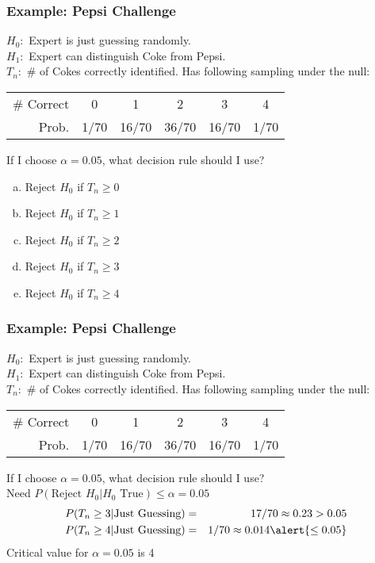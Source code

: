 \documentclass{beamer}
\begin{document}
\begin{frame}
\frametitle{Example: Pepsi Challenge }
\footnotesize 
$H_0\colon$ Expert is just guessing randomly.\\
$H_1\colon$ Expert can distinguish Coke from Pepsi.\\
$T_n\colon$ \# of Cokes correctly identified. Has following sampling under the null:
		\begin{center}
		\begin{tabular}{rccccc}
		\hline \footnotesize
		\# Correct & 0 & 1 & 2 & 3 & 4\\
		Prob.&1/70 & 16/70 & 36/70 & 16/70 &1/70\\
		\hline
		\end{tabular}
	\end{center}
	\vspace{2em}
	\normalsize
	\alert{If I choose $\alpha =0.05$, what decision rule should I use?}
	\begin{enumerate}[(a)]
		\item Reject $H_0$ if $T_n \geq 0$
		\item Reject $H_0$ if $T_n \geq 1$
		\item Reject $H_0$ if $T_n \geq 2$
		\item Reject $H_0$ if $T_n \geq 3$
		\item Reject $H_0$ if $T_n \geq 4$
	\end{enumerate}
\end{frame}
\begin{frame}
\frametitle{Example: Pepsi Challenge}
\footnotesize 
$H_0\colon$ Expert is just guessing randomly.\\
$H_1\colon$ Expert can distinguish Coke from Pepsi.\\
$T_n\colon$ \# of Cokes correctly identified. Has following sampling under the null:
		\begin{center}
		\begin{tabular}{rccccc}
		\hline \footnotesize
		\# Correct & 0 & 1 & 2 & 3 & 4\\
		Prob.&1/70 & 16/70 & 36/70 & 16/70 &1/70\\
		\hline
		\end{tabular}
	\end{center}
	\vspace{2em}
	\normalsize
	\alert{If I choose $\alpha =0.05$, what decision rule should I use?}\\
\vspace{1em}
	Need $P(\mbox{Reject } H_0|H_0 \mbox{ True})\leq \alpha = 0.05$ 
	\begin{eqnarray*}
		P(T_n \geq 3 |\mbox{Just Guessing}) &=& 17/70 \approx 0.23 > 0.05 \\
	P(T_n \geq 4 |\mbox{Just Guessing}) &=& 1/70  \approx 0.014 \alert{\leq 0.05}
	\end{eqnarray*}
	\vspace{1em}
	\alert{Critical value for $\alpha = 0.05$ is 4}
\end{frame}
\end{document}
